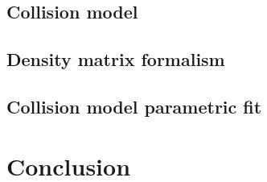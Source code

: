 \subsection{Collision model}

\subsection{Density matrix formalism}

\subsection{Collision model parametric fit}

\section{Conclusion}

